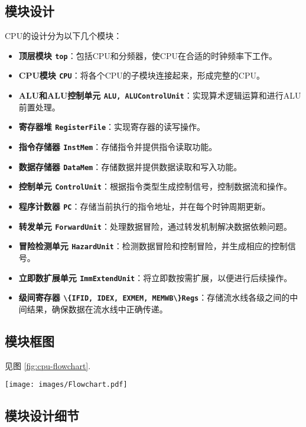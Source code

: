 \subsection{模块设计}
CPU的设计分为以下几个模块：
\begin{itemize}
    \item \textbf{顶层模块 \lstinline|top|}：包括CPU和分频器，使CPU在合适的时钟频率下工作。
    \item \textbf{CPU模块 \lstinline|CPU|}：将各个CPU的子模块连接起来，形成完整的CPU。
    \item \textbf{ALU和ALU控制单元 \lstinline|ALU, ALUControlUnit|}：实现算术逻辑运算和进行ALU前置处理。
    \item \textbf{寄存器堆 \lstinline|RegisterFile|}：实现寄存器的读写操作。
    \item \textbf{指令存储器 \lstinline|InstMem|}：存储指令并提供指令读取功能。
    \item \textbf{数据存储器 \lstinline|DataMem|}：存储数据并提供数据读取和写入功能。
    \item \textbf{控制单元 \lstinline|ControlUnit|}：根据指令类型生成控制信号，控制数据流和操作。
    \item \textbf{程序计数器 \lstinline|PC|}：存储当前执行的指令地址，并在每个时钟周期更新。
    \item \textbf{转发单元 \lstinline|ForwardUnit|}：处理数据冒险，通过转发机制解决数据依赖问题。
    \item \textbf{冒险检测单元 \lstinline|HazardUnit|}：检测数据冒险和控制冒险，并生成相应的控制信号。
    \item \textbf{立即数扩展单元 \lstinline|ImmExtendUnit|}：将立即数按需扩展，以便进行后续操作。
    \item \textbf{级间寄存器 \lstinline|\{IFID, IDEX, EXMEM, MEMWB\}Regs|}：存储流水线各级之间的中间结果，确保数据在流水线中正确传递。
\end{itemize}
    
\subsection{模块框图}
见图 \ref{fig:cpu-flowchart}.
\begin{figure*}[ht]
    \centering
    \texttt{[image: images/Flowchart.pdf]}
    \caption{CPU模块框图}
    \label{fig:cpu-flowchart}
\end{figure*}

\subsection{模块设计细节}

